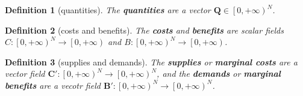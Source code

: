\documentclass{article}
\newtheorem{definition}{Definition}
\begin{document}
\begin{definition}[quantities]
The \textbf{quantities} are a vector $\mathbf Q\in\left[0,+\infty\right)^N$.
\end{definition}

\begin{definition}[costs and benefits]
The \textbf{costs} and \textbf{benefits} are scalar fields $C:\left[0,+\infty\right)^N\to\left[0,+\infty\right)$ and $B:\left[0,+\infty\right)^N\to\left[0,+\infty\right)$.
\end{definition}

\begin{definition}[supplies and demands]
The \textbf{supplies} or \textbf{marginal costs} are a vector field $\mathbf C':\left[0,+\infty\right)^N\to\left[0,+\infty\right)^N$, and the \textbf{demands} or \textbf{marginal benefits} are a vecotr field $\mathbf B':\left[0,+\infty\right)^N\to\left[0,+\infty\right)^N$.
\end{definition}
\end{document}
